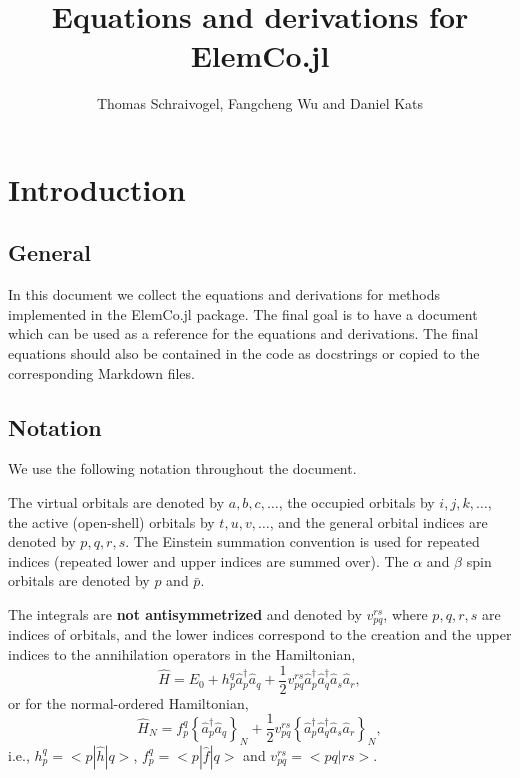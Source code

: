 \documentclass[a4paper,12pt,oneside]{book}
\newcommand{\op}{\hat}
\newcommand{\spa}[1]{{#1}}
\newcommand{\spb}[1]{\bar{#1}}
\newcommand{\ElemCojl}{\textsf{ElemCo.jl} }
\begin{document}
\title{Equations and derivations for \ElemCojl}
\author{Thomas Schraivogel, Fangcheng Wu and Daniel Kats}
\maketitle
\tableofcontents
\chapter{Introduction}
\section{General}
In this document we collect the equations and derivations for methods implemented in the \ElemCojl package.
The final goal is to have a document which can be used as a reference for the equations and derivations.
The final equations should also be contained in the code as docstrings or copied to the corresponding Markdown files.

\section{Notation}

We use the following notation throughout the document.

The virtual orbitals are denoted by $a,b,c,\ldots$, the occupied orbitals by $i,j,k,\ldots$,
the active (open-shell) orbitals by $t,u,v,\ldots$,
and the general orbital indices are denoted by $p,q,r,s$.
The Einstein summation convention is used for repeated indices (repeated lower and upper indices are summed over).
The $\alpha$ and $\beta$ spin orbitals are denoted by $\spa{p}$ and $\spb{p}$.

The integrals are \textbf{not antisymmetrized} and denoted by $v_{pq}^{rs}$, where $p,q,r,s$ are indices of orbitals,
and the lower indices correspond to the creation and the upper indices to the annihilation operators in the Hamiltonian,
\begin{equation}
  \op H = E_0 + h_p^q \op a^\dagger_p \op a_q + 
  \frac{1}{2} v_{pq}^{rs} \op a^\dagger_p \op a^\dagger_q \op a_s \op a_r,
\end{equation}
or for the normal-ordered Hamiltonian,
\begin{equation}
  \op H_N = f_p^q \left\{\op a^\dagger_p \op a_q\right\}_N + 
  \frac{1}{2} v_{pq}^{rs} \left\{\op a^\dagger_p \op a^\dagger_q \op a_s \op a_r\right\}_N,
\end{equation}
i.e., $h_p^q = <p|\op h|q>$, $f_p^q = <p|\op f|q>$ and $v_{pq}^{rs} = <pq|rs>$.
\end{document}
